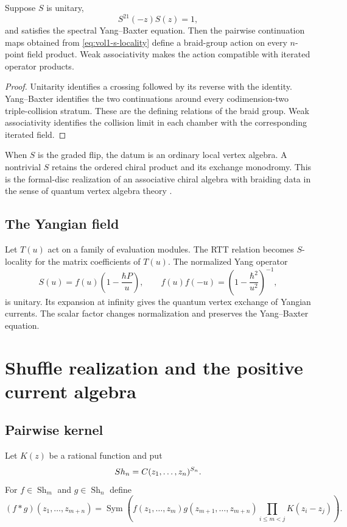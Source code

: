 \begin{theorem}
Suppose $S$ is unitary,
\[
 S^{21}(-z)S(z)=1,
\]
and satisfies the spectral Yang--Baxter equation.  Then the pairwise continuation maps obtained from \eqref{eq:vol1-s-locality} define a braid-group action on every $n$-point field product.  Weak associativity makes the action compatible with iterated operator products.
\end{theorem}
\begin{proof}
Unitarity identifies a crossing followed by its reverse with the identity.  Yang--Baxter identifies the two continuations around every codimension-two triple-collision stratum.  These are the defining relations of the braid group.  Weak associativity identifies the collision limit in each chamber with the corresponding iterated field.
\end{proof}

When $S$ is the graded flip, the datum is an ordinary local vertex algebra.  A nontrivial $S$ retains the ordered chiral product and its exchange monodromy.  This is the formal-disc realization of an associative chiral algebra with braiding data in the sense of quantum vertex algebra theory \cite{LiNonlocal,LiQVA}.

\section{The Yangian field}
Let $T(u)$ act on a family of evaluation modules.  The RTT relation becomes $S$-locality for the matrix coefficients of $T(u)$.  The normalized Yang operator
\[
 S(u)=f(u)\left(1-\frac{\hbar P}{u}\right),
 \qquad
 f(u)f(-u)=\left(1-\frac{\hbar^2}{u^2}\right)^{-1},
\]
is unitary.  Its expansion at infinity gives the quantum vertex exchange of Yangian currents.  The scalar factor changes normalization and preserves the Yang--Baxter equation.

\chapter{Shuffle realization and the positive current algebra}
\section{Pairwise kernel}
Let $K(z)$ be a rational function and put
\[
 Sh_n=C(z_1,\ldots,z_n)^{S_n}.
\]
For $f\in\operatorname{Sh}_m$ and $g\in\operatorname{Sh}_n$ define
\begin{equation}\label{eq:vol1-shuffle}
 (f*g)(z_1,\ldots,z_{m+n})
 =\operatorname{Sym}
 \left(
 f(z_1,\ldots,z_m)g(z_{m+1},\ldots,z_{m+n})
 \prod_{i\le m<j}K(z_i-z_j)
 \right).
\end{equation}

